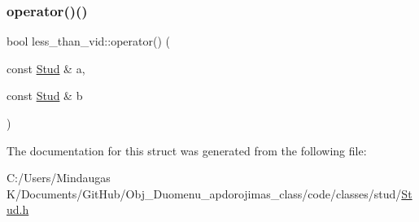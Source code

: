 \subsubsection{\texorpdfstring{operator()()}{operator()()}\hspace{0.1cm}{\footnotesize\ttfamily [2/2]}}
{\footnotesize\ttfamily bool less\+\_\+than\+\_\+vid\+::operator() (\begin{DoxyParamCaption}\item[{const \mbox{\hyperlink{class_stud}{Stud}} \&}]{a,  }\item[{const \mbox{\hyperlink{class_stud}{Stud}} \&}]{b }\end{DoxyParamCaption})\hspace{0.3cm}{\ttfamily [inline]}}



The documentation for this struct was generated from the following file\+:\begin{DoxyCompactItemize}
\item 
C\+:/\+Users/\+Mindaugas K/\+Documents/\+Git\+Hub/\+Obj\+\_\+\+Duomenu\+\_\+apdorojimas\+\_\+class/code/classes/stud/\mbox{\hyperlink{code_2classes_2stud_2_stud_8h}{Stud.\+h}}\end{DoxyCompactItemize}
